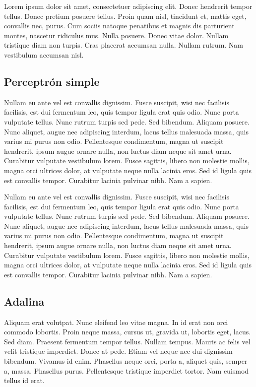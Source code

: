 Lorem ipsum dolor sit amet, consectetuer adipiscing elit.  Donec
hendrerit tempor tellus.  Donec pretium posuere tellus.  Proin quam
nisl, tincidunt et, mattis eget, convallis nec, purus.  Cum sociis
natoque penatibus et magnis dis parturient montes, nascetur ridiculus
mus.  Nulla posuere.  Donec vitae dolor.  Nullam tristique diam non
turpis.  Cras placerat accumsan nulla.  Nullam rutrum.  Nam vestibulum
accumsan nisl.

\subsection{Perceptrón simple}

Nullam eu ante vel est convallis dignissim.  Fusce suscipit, wisi nec
facilisis facilisis, est dui fermentum leo, quis tempor ligula erat
quis odio.  Nunc porta vulputate tellus.  Nunc rutrum turpis sed pede.
Sed bibendum.  Aliquam posuere.  Nunc aliquet, augue nec adipiscing
interdum, lacus tellus malesuada massa, quis varius mi purus non odio.
Pellentesque condimentum, magna ut suscipit hendrerit, ipsum augue
ornare nulla, non luctus diam neque sit amet urna.  Curabitur
vulputate vestibulum lorem.  Fusce sagittis, libero non molestie
mollis, magna orci ultrices dolor, at vulputate neque nulla lacinia
eros.  Sed id ligula quis est convallis tempor.  Curabitur lacinia
pulvinar nibh.  Nam a sapien.

Nullam eu ante vel est convallis dignissim.  Fusce suscipit, wisi nec
facilisis facilisis, est dui fermentum leo, quis tempor ligula erat
quis odio.  Nunc porta vulputate tellus.  Nunc rutrum turpis sed pede.
Sed bibendum.  Aliquam posuere.  Nunc aliquet, augue nec adipiscing
interdum, lacus tellus malesuada massa, quis varius mi purus non odio.
Pellentesque condimentum, magna ut suscipit hendrerit, ipsum augue
ornare nulla, non luctus diam neque sit amet urna.  Curabitur
vulputate vestibulum lorem.  Fusce sagittis, libero non molestie
mollis, magna orci ultrices dolor, at vulputate neque nulla lacinia
eros.  Sed id ligula quis est convallis tempor.  Curabitur lacinia
pulvinar nibh.  Nam a sapien.


\subsection{Adalina}

Aliquam erat volutpat.  Nunc eleifend leo vitae magna.  In id erat non
orci commodo lobortis.  Proin neque massa, cursus ut, gravida ut,
lobortis eget, lacus.  Sed diam.  Praesent fermentum tempor tellus.
Nullam tempus.  Mauris ac felis vel velit tristique imperdiet.  Donec
at pede.  Etiam vel neque nec dui dignissim bibendum.  Vivamus id
enim.  Phasellus neque orci, porta a, aliquet quis, semper a, massa.
Phasellus purus.  Pellentesque tristique imperdiet tortor.  Nam
euismod tellus id erat.


